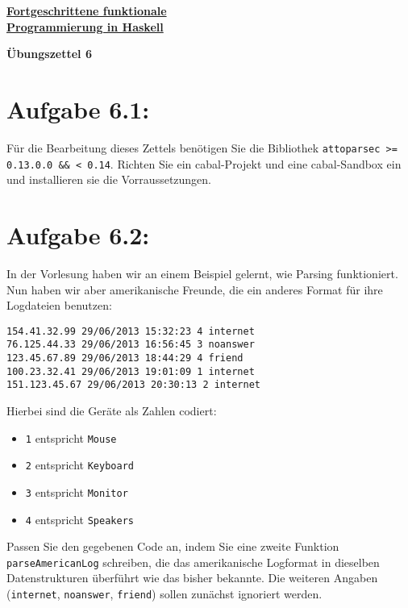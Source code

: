 \documentclass[a4paper,10pt]{scrartcl}
\newcommand{\underfat}[1]{\underline{\textbf{#1}}}
\newcommand{\theuebungszettel}{6}
\begin{document}
\begin{center}
  \begin{huge}
    \underfat{Fortgeschrittene funktionale}\\
    \underfat{Programmierung in Haskell}\\
  \end{huge}
\begin{LARGE}
\textbf{Übungszettel \theuebungszettel}
\end{LARGE}
\end{center}


\section*{Aufgabe \theuebungszettel.1:}
Für die Bearbeitung dieses Zettels benötigen Sie die Bibliothek \texttt{attoparsec >= 0.13.0.0 \&\& < 0.14}. Richten Sie ein cabal-Projekt und eine cabal-Sandbox ein und installieren sie die Vorraussetzungen.

\section*{Aufgabe \theuebungszettel.2:}
In der Vorlesung haben wir an einem Beispiel gelernt, wie Parsing funktioniert. Nun haben wir aber amerikanische Freunde, die ein anderes Format für ihre Logdateien benutzen:
\begin{verbatim}
154.41.32.99 29/06/2013 15:32:23 4 internet
76.125.44.33 29/06/2013 16:56:45 3 noanswer
123.45.67.89 29/06/2013 18:44:29 4 friend
100.23.32.41 29/06/2013 19:01:09 1 internet
151.123.45.67 29/06/2013 20:30:13 2 internet
\end{verbatim}
Hierbei sind die Geräte als Zahlen codiert:
\begin{itemize}
 \item \texttt{1} entspricht \texttt{Mouse}
 \item \texttt{2} entspricht \texttt{Keyboard}
 \item \texttt{3} entspricht \texttt{Monitor}
 \item \texttt{4} entspricht \texttt{Speakers}
\end{itemize}

Passen Sie den gegebenen Code an, indem Sie eine zweite Funktion \texttt{parseAmericanLog} schreiben, die das amerikanische Logformat in dieselben Datenstrukturen überführt wie das bisher bekannte. Die weiteren Angaben (\texttt{internet}, \texttt{noanswer}, \texttt{friend}) sollen zunächst ignoriert werden.
\end{document}
